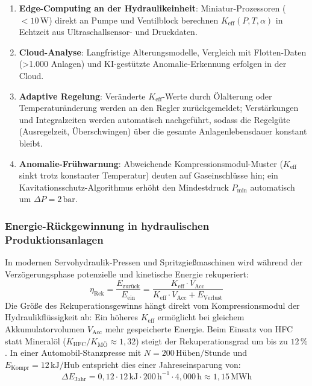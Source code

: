 ﻿\documentclass[a4paper,12pt]{scrreprt}
\theoremstyle{definition}
\begin{document}
\begin{enumerate}
  \item \textbf{Edge-Computing an der Hydraulikeinheit}: Miniatur-Prozessoren
    ($<10\,\mathrm{W}$) direkt an Pumpe und Ventilblock berechnen
    $K_{\mathrm{eff}}(P,T,\alpha)$ in Echtzeit aus Ultraschallsen\-sor-
    und Druckdaten.
  \item \textbf{Cloud-Analyse}: Langfristige Alterungsmodelle,
    Vergleich mit Flotten-Daten (>1.000 Anlagen) und KI-gestützte
    Anomalie-Erkennung erfolgen in der Cloud.
  \item \textbf{Adaptive Regelung}: Veränderte $K_{\mathrm{eff}}$-Werte
    durch Ölalterung oder Temperaturänderung werden an den Regler
    zurückgemeldet; Verstärkungen und  Integralzeiten werden
    automatisch nachgeführt, sodass die Regelgüte (Ausregelzeit,
    Überschwingen) über die gesamte Anlagenlebensdauer konstant bleibt.
  \item \textbf{Anomalie-Frühwarnung}: Abweichende Kompressionsmodul-Muster
    ($K_{\mathrm{eff}}$ sinkt trotz konstanter Temperatur) deuten auf
    Gaseinschlüsse hin; ein Kavitationsschutz-Algorithmus erhöht den
    Mindestdruck $P_{\min}$ automatisch um $\Delta P = 2\,\mathrm{bar}$.
\end{enumerate}

\subsubsection{Energie-Rückgewinnung in hydraulischen Produktionsanlagen}

In modernen Servohydraulik-Pressen und Spritzgießmaschinen wird
während der Verzögerungsphase potenzielle und kinetische Energie
rekuperiert:
\begin{equation}
  \eta_{\mathrm{Rek}} = \frac{E_{\mathrm{zurück}}}{E_{\mathrm{ein}}}
    = \frac{K_{\mathrm{eff}} \cdot V_{\mathrm{Acc}}}{K_{\mathrm{eff}} \cdot V_{\mathrm{Acc}} + E_{\mathrm{Verlust}}}
  \label{eq:rekuperation}
\end{equation}
Die Größe des Rekuperationsgewinns hängt direkt vom
Kompressionsmodul der Hydraulikflüssigkeit ab: Ein höheres
$K_{\mathrm{eff}}$ ermöglicht bei gleichem Akkumulatorvolumen
$V_{\mathrm{Acc}}$ mehr gespeicherte Energie. Beim Einsatz von HFC
statt Mineralöl ($K_{\mathrm{HFC}}/K_{\mathrm{MÖ}} \approx 1{,}32$)
steigt der Rekuperationsgrad um bis zu $12\,\%$. In einer Automobil-Stanzpresse
mit $N = 200\,\mathrm{Hüben/Stunde}$ und $E_{\mathrm{Kompr}} = 12\,\mathrm{kJ/Hub}$
entspricht dies einer Jahreseinsparung von:
\[
  \Delta E_{\mathrm{Jahr}}
    = 0{,}12 \cdot 12\,\mathrm{kJ} \cdot 200\,\mathrm{h}^{-1} \cdot 4{,}000\,\mathrm{h}
    \approx 1{,}15\,\mathrm{MWh}
\]
\end{document}
